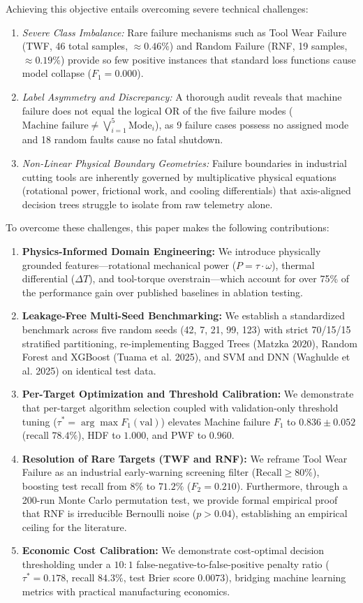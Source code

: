 \documentclass[conference]{IEEEtran}
\begin{document}
Achieving this objective entails overcoming severe technical challenges:
\begin{enumerate}
    \item \textit{Severe Class Imbalance:} Rare failure mechanisms such as Tool Wear Failure (TWF, 46 total samples, $\approx 0.46\%$) and Random Failure (RNF, 19 samples, $\approx 0.19\%$) provide so few positive instances that standard loss functions cause model collapse ($F_1 = 0.000$).
    \item \textit{Label Asymmetry and Discrepancy:} A thorough audit reveals that machine failure does not equal the logical OR of the five failure modes ($\text{Machine failure} \neq \bigvee_{i=1}^5 \text{Mode}_i$), as 9 failure cases possess no assigned mode and 18 random faults cause no fatal shutdown.
    \item \textit{Non-Linear Physical Boundary Geometries:} Failure boundaries in industrial cutting tools are inherently governed by multiplicative physical equations (rotational power, frictional work, and cooling differentials) that axis-aligned decision trees struggle to isolate from raw telemetry alone.
\end{enumerate}

To overcome these challenges, this paper makes the following contributions:
\begin{enumerate}
    \item \textbf{Physics-Informed Domain Engineering:} We introduce physically grounded features—rotational mechanical power ($P = \tau \cdot \omega$), thermal differential ($\Delta T$), and tool-torque overstrain—which account for over 75\% of the performance gain over published baselines in ablation testing.
    \item \textbf{Leakage-Free Multi-Seed Benchmarking:} We establish a standardized benchmark across five random seeds (42, 7, 21, 99, 123) with strict 70/15/15 stratified partitioning, re-implementing Bagged Trees (Matzka 2020), Random Forest and XGBoost (Tuama et al. 2025), and SVM and DNN (Waghulde et al. 2025) on identical test data.
    \item \textbf{Per-Target Optimization and Threshold Calibration:} We demonstrate that per-target algorithm selection coupled with validation-only threshold tuning ($\tau^* = \arg\max F_1(\text{val})$) elevates Machine failure $F_1$ to $0.836 \pm 0.052$ (recall $78.4\%$), HDF to $1.000$, and PWF to $0.960$.
    \item \textbf{Resolution of Rare Targets (TWF and RNF):} We reframe Tool Wear Failure as an industrial early-warning screening filter ($\text{Recall} \ge 80\%$), boosting test recall from $8\%$ to $71.2\%$ ($F_2 = 0.210$). Furthermore, through a 200-run Monte Carlo permutation test, we provide formal empirical proof that RNF is irreducible Bernoulli noise ($p > 0.04$), establishing an empirical ceiling for the literature.
    \item \textbf{Economic Cost Calibration:} We demonstrate cost-optimal decision thresholding under a $10:1$ false-negative-to-false-positive penalty ratio ($\tau^* = 0.178$, recall $84.3\%$, test Brier score $0.0073$), bridging machine learning metrics with practical manufacturing economics.
\end{enumerate}
\end{document}
